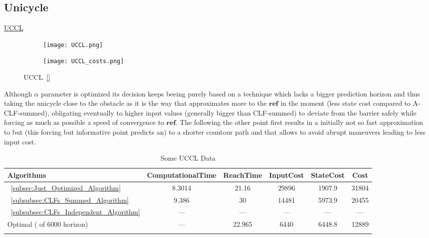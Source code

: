 \subsection{Unicycle}
\label{subsec:unicycle_experiments}

\underline{UCCL}
\label{ssssec:UCCL} %


\begin{figure}[htbp]
  \begin{subfigure}{0.6\textwidth}
    \centering
    \texttt{[image: UCCL.png]}
  \label{fig:UCCL_CostEvol}
  \end{subfigure}
  \begin{subfigure}{0.59\textwidth}
    \centering
    \texttt{[image: UCCL\_costs.png]}
  \label{fig:UCCL_trajectory}
  \end{subfigure}
  \caption{UCCL~\ref{}}
\label{fig:UCCLTrajectory_and_CostEvol}
\end{figure}


Although  \(\alpha\) parameter is optimized its decision keeps beeing purely based on a  technique which lacks a bigger prediction horizon and thus taking the unicycle close to the obstacle as it is the way that approximates more to the \(\mathbf{ref}\) in the moment (less state cost compared to A-CLF-summed), obligating eventually to higher input values (generally bigger than CLF-summed) to deviate from the barrier safely while forcing as much as possible a speed of convergence to \(\mathbf{ref}\).  The  following the other point first results in a initially not so fast approximation to \txtref but (this forcing but informative point predicts an) to a shorter countour path and that allows to avoid abrupt maneuvers leading to less input cost.  


  \bgroup
 \begin{xltabular}{\textwidth}{|l|ccccc|}
   \toprule
   Algorithms   & ComputationalTime  & ReachTime  & InputCost   & StateCost & Cost           \\
   \midrule
    ~\ref{subsec:Just_Optimized_Algorithm}           & 8.3014 & 21.16  & 29896 & 1907.9 & 31804 \\
    ~\ref{subsubsec:CLFs_Summed_Algorithm}        & 9.386  & 30     & 14481 & 5973.9 & 20455 \\
    ~\ref{subsubsec:CLFs_Independent_Algorithm}   & ---   & ---      & ---  & ---  & ---  \\
    Optimal ( of 6000 horizon)                        & ---    & 22.965 & 6440  & 6448.8 & 12889 \\
    \midrule
    \caption{Some UCCL Data}
    \label{tab:Some_UCCL_Data}\\
   \end{xltabular}
 \egroup


